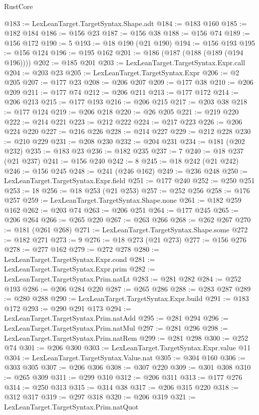 \begin{lexlean}{RustCore}
\begin{coremodule}
@183 := LexLeanTarget.TargetSyntax.Shape.adt
@184 := @183 @160
@185 := @182 @184
@186 := @156 @23
@187 := @156 @38
@188 := @156 @74
@189 := @156 @172
@190 := 5
@193 := @18 @190 (@21 @190)
@194 := @156 @193
@195 := @156 @124
@196 := @195 @162
@201 := @186 (@187 (@188 (@189 (@194 @196))))
@202 := @185 @201
@203 := LexLeanTarget.TargetSyntax.Expr.call
@204 := @203 @23
@205 := LexLeanTarget.TargetSyntax.Expr
@206 := @2 @205
@207 := @177 @23
@208 := @206 @207
@209 := @177 @38
@210 := @206 @209
@211 := @177 @74
@212 := @206 @211
@213 := @177 @172
@214 := @206 @213
@215 := @177 @193
@216 := @206 @215
@217 := @203 @38
@218 := @177 @124
@219 := @206 @218
@220 := @26 @205
@221 := @219 @220
@222 := @214 @221
@223 := @212 @222
@224 := @217 @223
@226 := @206 @224 @220
@227 := @216 @226
@228 := @214 @227
@229 := @212 @228
@230 := @210 @229
@231 := @208 @230
@232 := @204 @231
@234 := @181 (@202 @232)
@235 := @183 @23
@236 := @182 @235
@237 := 7
@240 := @18 @237 (@21 @237)
@241 := @156 @240
@242 := 8
@245 := @18 @242 (@21 @242)
@246 := @156 @245
@248 := @241 (@246 @162)
@249 := @236 @248
@250 := LexLeanTarget.TargetSyntax.Expr.field
@251 := @177 @240
@252 := @250 @251
@253 := 18
@256 := @18 @253 (@21 @253)
@257 := @252 @256
@258 := @176 @257
@259 := LexLeanTarget.TargetSyntax.Shape.none
@261 := @182 @259 @162
@262 := @203 @74
@263 := @206 @251
@264 := @177 @245
@265 := @206 @264
@266 := @265 @220
@267 := @263 @266
@268 := @262 @267
@270 := @181 (@261 @268)
@271 := LexLeanTarget.TargetSyntax.Shape.some
@272 := @182 @271
@273 := 9
@276 := @18 @273 (@21 @273)
@277 := @156 @276
@278 := @277 @162
@279 := @272 @278
@280 := LexLeanTarget.TargetSyntax.Expr.cond
@281 := LexLeanTarget.TargetSyntax.Expr.prim
@282 := LexLeanTarget.TargetSyntax.Prim.natLt
@283 := @281 @282
@284 := @252 @193
@286 := @206 @284 @220
@287 := @265 @286
@288 := @283 @287
@289 := @280 @288
@290 := LexLeanTarget.TargetSyntax.Expr.build
@291 := @183 @172
@293 := @290 @291 @173
@294 := LexLeanTarget.TargetSyntax.Prim.natAdd
@295 := @281 @294
@296 := LexLeanTarget.TargetSyntax.Prim.natMul
@297 := @281 @296
@298 := LexLeanTarget.TargetSyntax.Prim.natRem
@299 := @281 @298
@300 := @252 @74
@301 := @206 @300
@303 := LexLeanTarget.TargetSyntax.Expr.value @11
@304 := LexLeanTarget.TargetSyntax.Value.nat
@305 := @304 @160
@306 := @303 @305
@307 := @206 @306
@308 := @307 @220
@309 := @301 @308
@310 := @265 @309
@311 := @299 @310
@312 := @206 @311
@313 := @177 @276
@314 := @250 @313
@315 := @314 @38
@317 := @206 @315 @220
@318 := @312 @317
@319 := @297 @318
@320 := @206 @319
@321 := LexLeanTarget.TargetSyntax.Prim.natQuot

\end{coremodule}
\end{lexlean}
